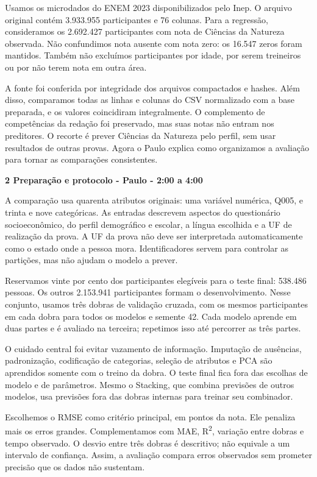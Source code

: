\documentclass[12pt,a4paper]{article}
\newcommand{\heading}[1]{\par\Needspace{4\baselineskip}\noindent\textbf{#1}\par\vspace{5pt}}
\begin{document}
Usamos os microdados do ENEM 2023 disponibilizados pelo Inep. O arquivo original contém 3.933.955 participantes e 76 colunas. Para a regressão, consideramos os 2.692.427 participantes com nota de Ciências da Natureza observada. Não confundimos nota ausente com nota zero: os 16.547 zeros foram mantidos. Também não excluímos participantes por idade, por serem treineiros ou por não terem nota em outra área.


A fonte foi conferida por integridade dos arquivos compactados e hashes. Além disso, comparamos todas as linhas e colunas do CSV normalizado com a base preparada, e os valores coincidiram integralmente. O complemento de competências da redação foi preservado, mas suas notas não entram nos preditores. O recorte é prever Ciências da Natureza pelo perfil, sem usar resultados de outras provas. Agora o Paulo explica como organizamos a avaliação para tornar as comparações consistentes.


\heading{2 Preparação e protocolo - Paulo - 2:00 a 4:00}
A comparação usa quarenta atributos originais: uma variável numérica, Q005, e trinta e nove categóricas. As entradas descrevem aspectos do questionário socioeconômico, do perfil demográfico e escolar, a língua escolhida e a UF de realização da prova. A UF da prova não deve ser interpretada automaticamente como o estado onde a pessoa mora. Identificadores servem para controlar as partições, mas não ajudam o modelo a prever.


Reservamos vinte por cento dos participantes elegíveis para o teste final: 538.486 pessoas. Os outros 2.153.941 participantes formam o desenvolvimento. Nesse conjunto, usamos três dobras de validação cruzada, com os mesmos participantes em cada dobra para todos os modelos e semente 42. Cada modelo aprende em duas partes e é avaliado na terceira; repetimos isso até percorrer as três partes.


O cuidado central foi evitar vazamento de informação. Imputação de ausências, padronização, codificação de categorias, seleção de atributos e PCA são aprendidos somente com o treino da dobra. O teste final fica fora das escolhas de modelo e de parâmetros. Mesmo o Stacking, que combina previsões de outros modelos, usa previsões fora das dobras internas para treinar seu combinador.


Escolhemos o RMSE como critério principal, em pontos da nota. Ele penaliza mais os erros grandes. Complementamos com MAE, R\textsuperscript{2}, variação entre dobras e tempo observado. O desvio entre três dobras é descritivo; não equivale a um intervalo de confiança. Assim, a avaliação compara erros observados sem prometer precisão que os dados não sustentam.
\end{document}
